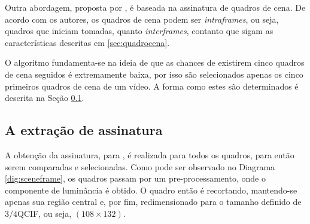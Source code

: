   Outra abordagem, proposta por \citeauthor{mao2015sceneframe}, é baseada na assinatura de quadros de cena. De acordo com os autores, os quadros de cena podem ser \textit{intraframes}, ou seja, quadros que iniciam tomadas, quanto \textit{interframes}, contanto que sigam as características descritas em \ref{sec:quadrocena}.
    
    O algoritmo fundamenta-se na ideia de que as chances de existirem cinco quadros de cena seguidos é extremamente baixa, por isso são selecionados apenas os cinco primeiros quadros de cena de um vídeo. A forma como estes são determinados é descrita na Seção \ref{subsec:fptsceneframe}.

\subsection{A extração de assinatura}
\label{subsec:fptsceneframe}

% 

A obtenção da assinatura, para \citeauthor{mao2015sceneframe}, é realizada para todos os quadros, para então serem comparadas e selecionadas. Como pode ser observado no Diagrama \ref{dig:sceneframe}, os quadros passam por um pre-processamento, onde o componente de luminância é obtido. O quadro então é recortando, mantendo-se apenas sua região central e, por fim, redimensionado para o tamanho definido de $3/4$QCIF, ou seja, $(108\times132)$.


